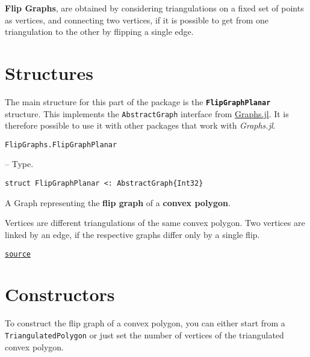 \label{5007793054777268130}{}


\textbf{Flip Graphs}, are obtained by considering triangulations on a fixed set of points as vertices, and connecting two vertices, if it is possible to get from one triangulation to the other by flipping a single edge.



\section{Structures}



\label{15035490444877811912}{}


The main structure for this part of the package is the \textbf{\texttt{FlipGraphPlanar}} structure.  This implements the \texttt{AbstractGraph} interface from \href{https://juliagraphs.org/Graphs.jl/stable/}{Graphs.jl}.  It is therefore possible to use it with other packages that work with \emph{Graphs.jl}.


\hypertarget{10784171746981031091}{\texttt{FlipGraphs.FlipGraphPlanar}}  -- {Type.}

\begin{adjustwidth}{2em}{0pt}


\begin{verbatim}
struct FlipGraphPlanar <: AbstractGraph{Int32}
\end{verbatim}

A Graph representing the \textbf{flip graph} of a \textbf{convex polygon}. 

Vertices are different triangulations of the same convex polygon. Two vertices are linked by an edge, if the respective graphs differ only by a single flip.



\href{https://github.com/schto223/FlipGraphs.jl/blob/490c01a7adf74b42f27dda05099165c47ae8133e/src/flipGraphPlanar.jl#L1-L8}{\texttt{source}}


\end{adjustwidth}

\section{Constructors}



\label{1468722345706912774}{}


To construct the flip graph of a convex polygon, you can either start from a \texttt{TriangulatedPolygon} or just set the number of vertices of the triangulated convex polygon.



